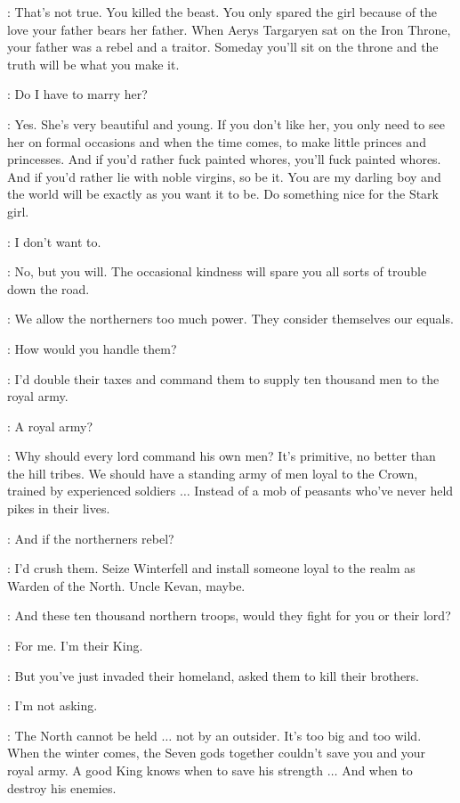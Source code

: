 \CERSEI: That's not true. You killed the beast. You only spared the girl because of the love your father bears her father. When Aerys Targaryen sat on the Iron Throne, your father was a rebel and a traitor. Someday you'll sit on the throne and the truth will be what you make it. 

\JOFFREY: Do I have to marry her? 

\CERSEI: Yes. She's very beautiful and young. If you don't like her, you only need to see her on formal occasions and when the time comes, to make little princes and princesses. And if you'd rather fuck painted whores, you'll fuck painted whores. And if you'd rather lie with noble virgins, so be it. You are my darling boy and the world will be exactly as you want it to be. Do something nice for the Stark girl. 

\JOFFREY: I don't want to. 

\CERSEI: No, but you will. The occasional kindness will spare you all sorts of trouble down the road. 

\JOFFREY: We allow the northerners too much power. They consider themselves our equals. 

\CERSEI: How would you handle them? 

\JOFFREY: I'd double their taxes and command them to supply ten thousand men to the royal army. 

\CERSEI: A royal army? 

\JOFFREY: Why should every lord command his own men? It's primitive, no better than the hill tribes. We should have a standing army of men loyal to the Crown, trained by experienced soldiers $\ldots$ Instead of a mob of peasants who've never held pikes in their lives. 

\CERSEI: And if the northerners rebel? 

\JOFFREY: I'd crush them. Seize Winterfell and install someone loyal to the realm as Warden of the North. Uncle Kevan, maybe. 

\CERSEI: And these ten thousand northern troops, would they fight for you or their lord? 

\JOFFREY: For me. I'm their King. 

\CERSEI: But you've just invaded their homeland, asked them to kill their brothers. 

\JOFFREY: I'm not asking. 

\CERSEI: The North cannot be held $\ldots$ not by an outsider. It's too big and too wild. When the winter comes, the Seven gods together couldn't save you and your royal army. A good King knows when to save his strength $\ldots$ And when to destroy his enemies. 

